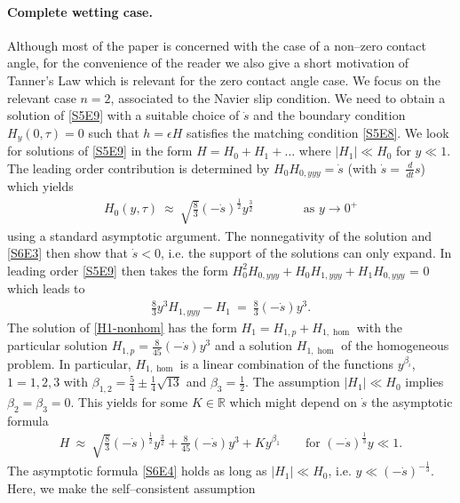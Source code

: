 \documentclass[pagesize,pdftex]{amsart}
\newcommand{\R}{\mathbb{R}}
\newcommand{\bet}{\beta}
\newcommand{\eps}{\epsilon}
\newcommand{\ddt}{\, \frac{d}{dt}}
\begin{document}
\medskip

\paragraph{Complete wetting case.} Although most of the paper is concerned with
the case of a non--zero contact angle, for the convenience of the reader we also
give a short motivation of Tanner's Law which is relevant for the zero contact
angle case. We focus on the relevant case $n=2$, associated to the Navier slip
condition. We need to obtain a solution of \eqref{S5E9} with a suitable choice
of $\dot s$ and the boundary condition $H_y\left(0,\tau \right) =0$ such that
$h = \eps H$ satisfies the matching condition \eqref{S5E8}. We look for
solutions of \eqref{S5E9} in the form $H= H_{0}+H_1 + \ldots$ where
$|H_1| \ll H_{0}$ for $y \ll 1$.  The leading order contribution is determined
by $H_{0}H_{0,yyy} = \dot s$ (with $\dot s = \ddt s$) which yields
\begin{align}
H_0(y,\tau)  \  \approx \ \sqrt{\tfrac 83} (-\dot s)^{\frac 12}y^{\frac 32} \qquad\qquad %
  \text{as $y\to 0^+$}  \label{S6E3}
\end{align}
using a standard asymptotic argument.  The nonnegativity of the solution and
\eqref{S6E3} then show that $\dot s <0$, i.e. the support of the solutions can
only expand. In leading order \eqref{S5E9} then takes the form
$H_0^2 H_{0,yyy} + H_0 H_{1,yyy} + H_1 H_{0,yyy}$ = $0$ which leads to
\begin{align} \label{H1-nonhom} %
  \frac 83 y^3H_{1,yyy}-H_1 \ = \ \frac 83 (-\dot s) y^3.
\end{align}
The solution of \eqref{H1-nonhom} has the form $H_1 = H_{1,p} + H_{1,\hom }$
with the particular solution $H_{1,p} = \frac 8{45}(-\dot s) y^3$ and a solution
$H_{1,\hom}$ of the homogeneous problem. In particular, $H_{1,\hom}$ is a linear
combination of the functions $y^{\bet_i}$, $1 = 1,2,3$ with
$\bet_{1,2} = \frac{5}{4} \pm \frac 1{4}\sqrt{13}$ and $\bet_3 = \frac 12$. The
assumption $|H_1| \ll H_0$ implies $\bet_2 = \bet_3 = 0$. This yields for some
$K\in \R$ which might depend on $\dot s$ the asymptotic formula
\begin{align}
  H \ %
  \approx \ \sqrt{\frac{8}3} (-\dot s)^{\frac 12}y^{\frac 32}+ \frac 8{45} (-\dot s) y^3+Ky^{\bet_1}
  \qquad  %
  \text{for $(-\dot s)^{\frac 13} y \ll 1$.}
  \label{S6E4}
\end{align}
The asymptotic formula \eqref{S6E4} holds as long as $|H_1| \ll H_0$, i.e.
$y \ll (-\dot s)^{-\frac 13}$. Here, we make the self--consistent assumption
\end{document}
